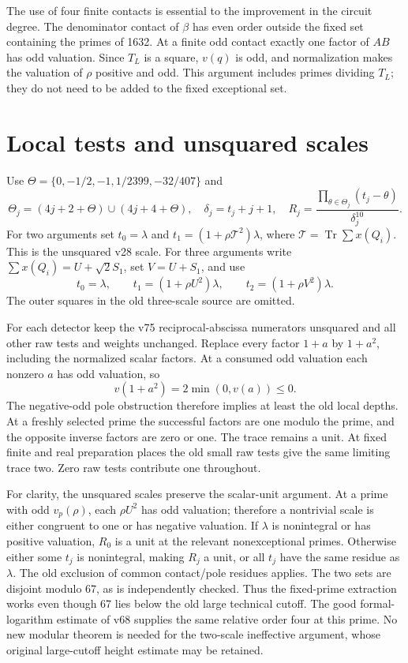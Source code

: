 \documentclass[11pt]{article}
\newcommand{\Tr}{\operatorname{Tr}}\newcommand{\Nm}{\operatorname{Nm}}
\begin{document}
The use of four finite contacts is essential to the improvement in the
circuit degree. The denominator contact of $\beta$ has even order
outside the fixed set containing the primes of 1632. At a finite odd
contact exactly one factor of $AB$ has odd valuation. Since $T_L$ is
a square, $v(q)$ is odd, and normalization makes the valuation of $\rho$
positive and odd. This argument includes primes dividing $T_L$; they
do not need to be added to the fixed exceptional set.

\section{Local tests and unsquared scales}

Use $\Theta=\{0,-1/2,-1,1/2399,-32/407\}$ and
\[
 \Theta_j=(4j+2+\Theta)\cup(4j+4+\Theta),\quad
 \delta_j=t_j+j+1,\quad
 R_j=\frac{\prod_{\theta\in\Theta_j}(t_j-\theta)}{\delta_j^{10}}.
\]
For two arguments set $t_0=\lambda$ and
$t_1=(1+\rho\mathcal T^2)\lambda$, where
$\mathcal T=\Tr\sum x(Q_i)$. This is the unsquared v28 scale.
For three arguments write $\sum x(Q_i)=U+\sqrt2S_1$, set $V=U+S_1$,
and use
\[
 t_0=\lambda,\qquad t_1=(1+\rho U^2)\lambda,\qquad
 t_2=(1+\rho V^2)\lambda.
\]
The outer squares in the old three-scale source are omitted.

For each detector keep the v75 reciprocal-abscissa numerators unsquared
and all other raw tests and weights unchanged. Replace every factor
$1+a$ by $1+a^2$, including the normalized scalar factors.
At a consumed odd valuation each nonzero $a$ has odd valuation, so
\[
 v(1+a^2)=2\min(0,v(a))\le0.
\]
The negative-odd pole obstruction therefore implies at least the old
local depths. At a freshly selected prime the successful factors are
one modulo the prime, and the opposite inverse factors are zero or one.
The trace remains a unit. At fixed finite and real preparation places
the old small raw tests give the same limiting trace two. Zero raw
tests contribute one throughout.

For clarity, the unsquared scales preserve the scalar-unit argument.
At a prime with odd $v_p(\rho)$, each $\rho U^2$ has odd valuation;
therefore a nontrivial scale is either congruent to one or has negative
valuation. If $\lambda$ is nonintegral or has positive valuation,
$R_0$ is a unit at the relevant nonexceptional primes. Otherwise
either some $t_j$ is nonintegral, making $R_j$ a unit, or all $t_j$
have the same residue as $\lambda$. The old exclusion of common
contact/pole residues applies. The two sets are disjoint modulo 67,
as is independently checked. Thus the fixed-prime extraction works
even though 67 lies below the old large technical cutoff. The good
formal-logarithm estimate of v68 supplies the same relative order four
at this prime. No new modular theorem is needed for the two-scale
ineffective argument, whose original large-cutoff height estimate may
be retained.
\end{document}
